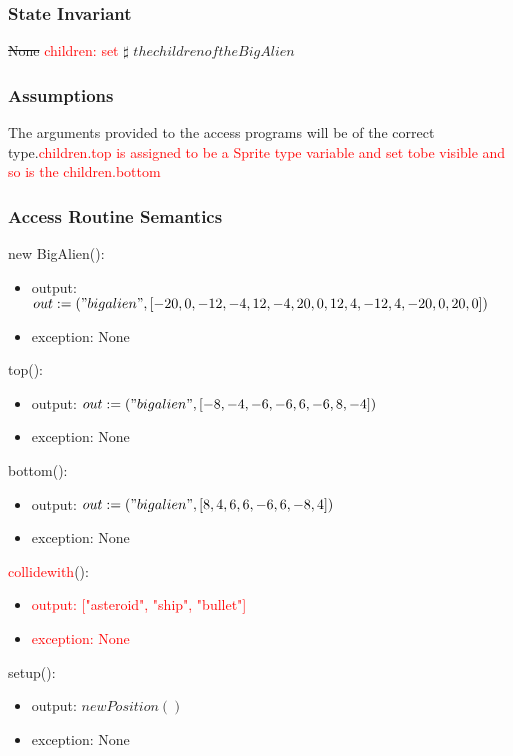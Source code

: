 \documentclass[12pt]{article}
\begin{document}
\subsubsection* {State Invariant}
\sout{None}
\textcolor{red}{children: set} $\sharp$ $the children of the BigAlien$

\subsubsection* {Assumptions}

The arguments provided to the access programs will be of the correct type.\textcolor{red}{children.top is assigned to be a Sprite type variable and set tobe visible and so is the children.bottom}

\subsubsection* {Access Routine Semantics}

\noindent new BigAlien():
\begin{itemize} 
\item output: $out := ("bigalien",[-20,0,-12,-4,12,-4,20, 0, 12, 4,-12 ,4, -20, 0, 20 ,0])$
\item exception: None
\end{itemize}

\noindent top():
\begin{itemize} 
\item output: $out := ("bigalien",[-8,-4,-6,-6,6,-6,8,-4])$
\item exception: None
\end{itemize}

\noindent bottom():
\begin{itemize} 
\item output: $out := ("bigalien",[8,4,6,6,-6,6,-8,4])$
\item exception: None
\end{itemize}

\noindent \textcolor{red}{collidewith}():
\begin{itemize} 
\item \textcolor{red}{output: ["asteroid", "ship", "bullet"]}
\item \textcolor{red}{exception: None}
\end{itemize}

\noindent setup():
\begin{itemize} 
\item output: $newPosition()$
\item exception: None
\end{itemize}
\end{document}
